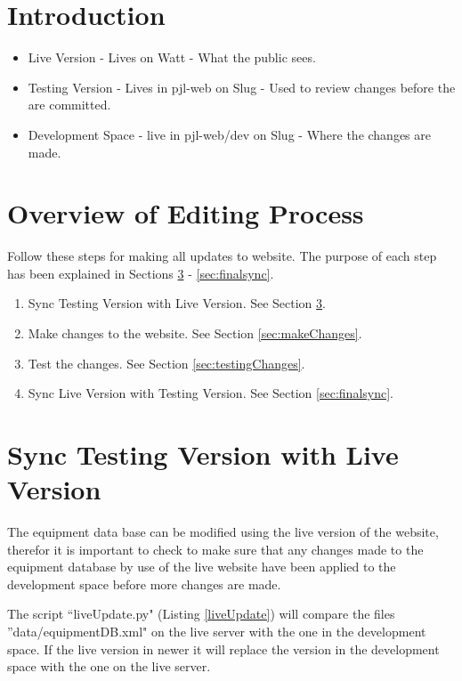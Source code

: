 \documentclass[justified]{LabArx1_5}
\begin{document}
\section{Introduction}

\begin{itemize}
\item Live Version - Lives on Watt - What the public sees.
\item Testing Version - Lives in pjl-web on Slug - Used to review changes before the are committed.
\item Development Space - live in pjl-web/dev on Slug - Where the changes are made.
\end{itemize}


\section{Overview of Editing Process}

Follow these steps for making all updates to website. The purpose of each step has been explained in Sections \ref{sec:initsync} - \ref{sec:finalsync}.

\begin{enumerate}
\item Sync Testing Version with Live Version. See Section \ref{sec:initsync}.
\item Make changes to the website. See Section \ref{sec:makeChanges}.
\item Test the changes. See Section  \ref{sec:testingChanges}.
\item Sync Live Version with Testing Version. See Section \ref{sec:finalsync}.
\end{enumerate}

\section{Sync Testing Version with Live Version}\label{sec:initsync}

The equipment data base can be modified using the live version of the website, therefor it is important to check to make sure that any changes made to the equipment database by use of the live website have been applied to the development space before more changes are made. 

The script ``liveUpdate.py" (Listing \ref{liveUpdate}) will compare the files ''data/equipmentDB.xml" on the live server with the one in the development space. If the live version in newer it will replace the version in the development space with the one on the live server.
\end{document}
